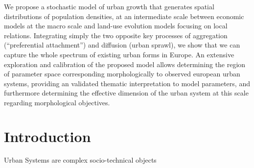 \documentclass[10pt,letterpaper]{article}
\begin{document}
We propose a stochastic model of urban growth that generates spatial distributions of population densities, at an intermediate scale between economic models at the macro scale and land-use evolution models focusing on local relations. Integrating simply the two opposite key processes of aggregation (``preferential attachment'') and diffusion (urban sprawl), we show that we can capture the whole spectrum of existing urban forms in Europe. An extensive exploration and calibration of the proposed model allows determining the region of parameter space corresponding morphologically to observed european urban systems, providing an validated thematic interpretation to model parameters, and furthermore determining the effective dimension of the urban system at this scale regarding morphological objectives.







\linenumbers







\section{Introduction}

Urban Systems are complex socio-technical objects





\end{document}
